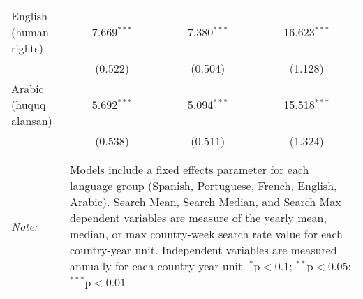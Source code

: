 \begin{table}[!htbp]
\begin{tabular}{@{\extracolsep{5pt}}lccc}
  English (human rights) & 7.669$^{***}$ & 7.380$^{***}$ & 16.623$^{***}$ \\ 
  & (0.522) & (0.504) & (1.128) \\ 
  Arabic (huquq alansan) & 5.692$^{***}$ & 5.094$^{***}$ & 15.518$^{***}$ \\ 
  & (0.538) & (0.511) & (1.324) \\ 
 \hline \\[-1.8ex] 
\hline 
\hline \\[-1.8ex] 
\textit{Note:}  & \multicolumn{3}{l}{\parbox[t]{8cm}{Models include a fixed effects parameter for each language group (Spanish, Portuguese, French, English, Arabic). Search Mean, Search Median, and Search Max dependent variables are measure of the yearly mean, median, or max country-week search rate value for each country-year unit. Independent variables are measured annually for each country-year unit. $^{*}$p$<$0.1; $^{**}$p$<$0.05; $^{***}$p$<$0.01}} \\ 
\end{tabular} 
\end{table} 
